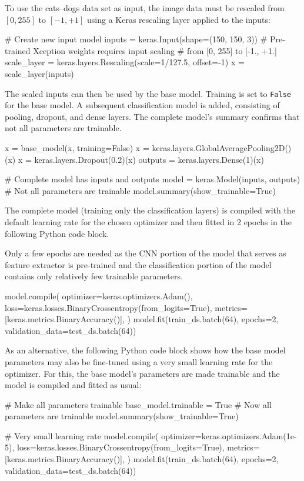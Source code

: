 To use the cats--dogs data set as input, the image data must be rescaled from $[0, 255]$ to $[-1, +1]$ using a Keras rescaling layer applied to the inputs:
\begin{pythoncode}
# Create new input model
inputs = keras.Input(shape=(150, 150, 3))
# Pre-trained Xception weights requires input scaling
# from [0, 255] to [-1., +1.]
scale_layer = keras.layers.Rescaling(scale=1/127.5, offset=-1)
x = scale_layer(inputs)
\end{pythoncode}

The scaled inputs can then be used by the base model. Training is set to \texttt{False} for the base model. A subsequent classification model is added, consisting of pooling, dropout, and dense layers. The complete model's summary confirms that not all parameters are trainable.
\begin{pythoncode}
x = base_model(x, training=False)
x = keras.layers.GlobalAveragePooling2D()(x)
x = keras.layers.Dropout(0.2)(x)
outputs = keras.layers.Dense(1)(x)

# Complete model has inputs and outputs
model = keras.Model(inputs, outputs)
# Not all parameters are trainable
model.summary(show_trainable=True)
\end{pythoncode}

The complete model (training only the classification layers) is compiled with the default learning rate for the chosen optimizer and then fitted in 2 epochs in the following Python code block. 

\begin{infobox}Only a few epochs are needed as the CNN portion of the model that serves as feature extractor is pre-trained and the classification portion of the model contains only relatively few trainable parameters.\end{infobox}


\begin{pythoncode}
model.compile(
    optimizer=keras.optimizers.Adam(),
    loss=keras.losses.BinaryCrossentropy(from_logits=True),
    metrics=[keras.metrics.BinaryAccuracy()],
)
model.fit(train_ds.batch(64), epochs=2, 
          validation_data=test_ds.batch(64))
\end{pythoncode}

As an alternative, the following Python code block shows how the base model parameters may also be fine-tuned using a very small learning rate for the optimizer. For this, the base model's parameters are made trainable and the model is compiled and fitted as usual:
\begin{pythoncode}
# Make all parameters trainable
base_model.trainable = True
# Now all parameters are trainable
model.summary(show_trainable=True)

# Very small learning rate
model.compile(
    optimizer=keras.optimizers.Adam(1e-5),
    loss=keras.losses.BinaryCrossentropy(from_logits=True),
    metrics=[keras.metrics.BinaryAccuracy()],
)
model.fit(train_ds.batch(64), epochs=2, 
          validation_data=test_ds.batch(64))
\end{pythoncode}

